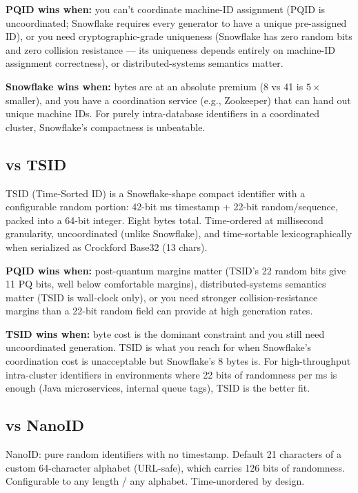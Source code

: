 \textbf{PQID wins when:} you can't coordinate machine-ID assignment (PQID is uncoordinated; Snowflake requires every generator to have a unique pre-assigned ID), or you need cryptographic-grade uniqueness (Snowflake has zero random bits and zero collision resistance --- its uniqueness depends entirely on machine-ID assignment correctness), or distributed-systems semantics matter.

\textbf{Snowflake wins when:} bytes are at an absolute premium (8 vs 41 is $5\times$ smaller), and you have a coordination service (e.g., Zookeeper) that can hand out unique machine IDs. For purely intra-database identifiers in a coordinated cluster, Snowflake's compactness is unbeatable.

\subsection{vs TSID \citep{tsid}}

TSID (Time-Sorted ID) is a Snowflake-shape compact identifier with a configurable random portion: 42-bit ms timestamp + 22-bit random/sequence, packed into a 64-bit integer. Eight bytes total. Time-ordered at millisecond granularity, uncoordinated (unlike Snowflake), and time-sortable lexicographically when serialized as Crockford Base32 (13 chars).

\textbf{PQID wins when:} post-quantum margins matter (TSID's 22 random bits give 11 PQ bits, well below comfortable margins), distributed-systems semantics matter (TSID is wall-clock only), or you need stronger collision-resistance margins than a 22-bit random field can provide at high generation rates.

\textbf{TSID wins when:} byte cost is the dominant constraint and you still need uncoordinated generation. TSID is what you reach for when Snowflake's coordination cost is unacceptable but Snowflake's 8 bytes is. For high-throughput intra-cluster identifiers in environments where 22 bits of randomness per ms is enough (Java microservices, internal queue tags), TSID is the better fit.

\subsection{vs NanoID \citep{nanoid}}

NanoID: pure random identifiers with no timestamp. Default 21 characters of a custom 64-character alphabet (URL-safe), which carries 126 bits of randomness. Configurable to any length / any alphabet. Time-unordered by design.

